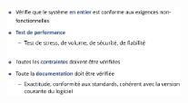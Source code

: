 \documentclass[16pt]{report}
\begin{document}
\begin{multicols*}{2}
       \begin{figure}[H]
        \begin{center}
            \includegraphics[width=0.45\textwidth]{testfonc2.png}
        \end{center}
       \end{figure}


       




 



    



       
       


       
       



        
        

    






\end{multicols*}
\end{document}
